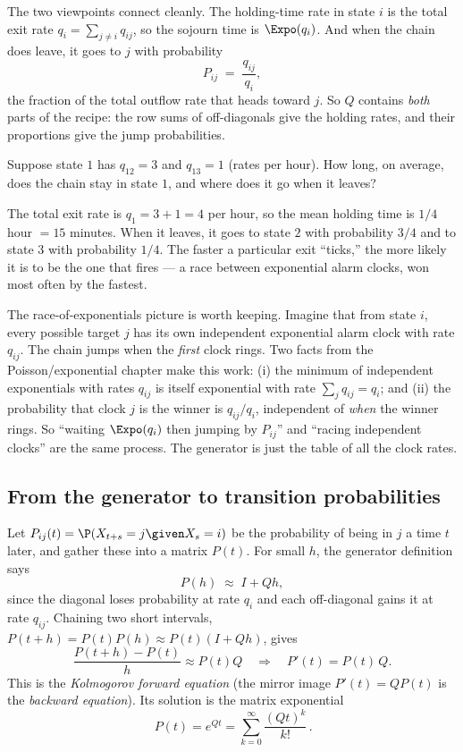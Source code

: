 The two viewpoints connect cleanly. The holding-time rate in state $i$ is the total exit rate
$q_i = \sum_{j \ne i} q_{ij}$, so the sojourn time is $\Expo(q_i)$. And when the chain does leave,
it goes to $j$ with probability
\[
  P_{ij} \;=\; \frac{q_{ij}}{q_i},
\]
the fraction of the total outflow rate that heads toward $j$. So $Q$ contains \emph{both} parts of
the recipe: the row sums of off-diagonals give the holding rates, and their proportions give the
jump probabilities.

\begin{walkbox}
Suppose state $1$ has $q_{12} = 3$ and $q_{13} = 1$ (rates per hour). How long, on average, does the
chain stay in state $1$, and where does it go when it leaves?

The total exit rate is $q_1 = 3 + 1 = 4$ per hour, so the mean holding time is $1/4$ hour $= 15$
minutes. When it leaves, it goes to state $2$ with probability $3/4$ and to state $3$ with
probability $1/4$. The faster a particular exit ``ticks,'' the more likely it is to be the one that
fires --- a race between exponential alarm clocks, won most often by the fastest.
\end{walkbox}

\begin{connectionbox}
The race-of-exponentials picture is worth keeping. Imagine that from state $i$, every possible
target $j$ has its own independent exponential alarm clock with rate $q_{ij}$. The chain jumps when
the \emph{first} clock rings. Two facts from the Poisson/exponential chapter make this work: (i) the
minimum of independent exponentials with rates $q_{ij}$ is itself exponential with rate
$\sum_j q_{ij} = q_i$; and (ii) the probability that clock $j$ is the winner is
$q_{ij}/q_i$, independent of \emph{when} the winner rings. So ``waiting $\Expo(q_i)$ then jumping by
$P_{ij}$'' and ``racing independent clocks'' are the same process. The generator is just the table of
all the clock rates.
\end{connectionbox}

\subsection{From the generator to transition probabilities}

Let $P_{ij}(t) = \P(X_{t+s} = j \given X_s = i)$ be the probability of being in $j$ a time $t$ later,
and gather these into a matrix $P(t)$. For small $h$, the generator definition says
\[
  P(h) \;\approx\; I + Q h,
\]
since the diagonal loses probability at rate $q_i$ and each off-diagonal gains it at rate $q_{ij}$.
Chaining two short intervals, $P(t+h) = P(t)P(h) \approx P(t)(I + Qh)$, gives
\[
  \frac{P(t+h) - P(t)}{h} \approx P(t)Q
  \quad\Longrightarrow\quad
  P'(t) = P(t)\,Q.
\]
This is the \emph{Kolmogorov forward equation} (the mirror image $P'(t) = QP(t)$ is the
\emph{backward equation}). Its solution is the matrix exponential
\[
  \boxed{\,P(t) = e^{Qt} = \sum_{k=0}^{\infty} \frac{(Qt)^k}{k!}\,.}
\]

